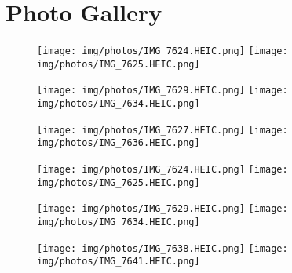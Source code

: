 \section{Photo Gallery}
\vspace{2em}
\begin{figure}[h]
  \centering
    \texttt{[image: img/photos/IMG\_7624.HEIC.png]}\hspace{5em}
    \texttt{[image: img/photos/IMG\_7625.HEIC.png]}

    \vspace{1em}
    \texttt{[image: img/photos/IMG\_7629.HEIC.png]}\hspace{5em}
    \texttt{[image: img/photos/IMG\_7634.HEIC.png]}

    \vspace{1em}
    \texttt{[image: img/photos/IMG\_7627.HEIC.png]}\hspace{5em}
    \texttt{[image: img/photos/IMG\_7636.HEIC.png]}
\end{figure}

\newpage
\begin{figure}[h]
  \centering
    \texttt{[image: img/photos/IMG\_7624.HEIC.png]}\hspace{5em}
    \texttt{[image: img/photos/IMG\_7625.HEIC.png]}

    \vspace{5em}
    \texttt{[image: img/photos/IMG\_7629.HEIC.png]}\hspace{5em}
    \texttt{[image: img/photos/IMG\_7634.HEIC.png]}

    \vspace{5em}
    \texttt{[image: img/photos/IMG\_7638.HEIC.png]}\hspace{5em}
    \texttt{[image: img/photos/IMG\_7641.HEIC.png]}
\end{figure}